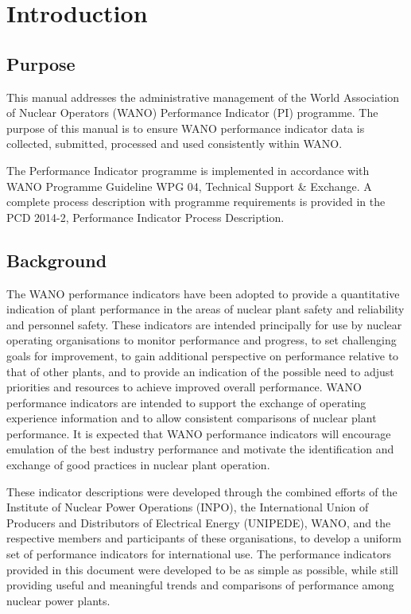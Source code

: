 \section*{Introduction}
\subsection*{Purpose}
This manual addresses the administrative management of the World
Association of Nuclear Operators (WANO) Performance Indicator (PI)
programme. The purpose of this manual is to ensure WANO performance
indicator data is collected, submitted, processed and used
consistently within WANO.

The Performance Indicator programme is implemented in accordance with
WANO Programme Guideline WPG 04, Technical Support \& Exchange. A
complete process description with programme requirements is provided
in the PCD 2014-2, Performance Indicator Process Description.

\subsection*{Background}
The WANO performance indicators have been adopted to provide a
quantitative indication of plant performance in the areas of nuclear
plant safety and reliability and personnel safety. These indicators
are intended principally for use by nuclear operating organisations to
monitor performance and progress, to set challenging goals for
improvement, to gain additional perspective on performance relative to
that of other plants, and to provide an indication of the possible
need to adjust priorities and resources to achieve improved overall
performance. WANO performance indicators are intended to support the
exchange of operating experience information and to allow consistent
comparisons of nuclear plant performance. It is expected that WANO
performance indicators will encourage emulation of the best industry
performance and motivate the identification and exchange of good
practices in nuclear plant operation.

These indicator descriptions were developed through the combined
efforts of the Institute of Nuclear Power Operations (INPO), the
International Union of Producers and Distributors of Electrical Energy
(UNIPEDE), WANO, and the respective members and participants of these
organisations, to develop a uniform set of performance indicators for
international use. The performance indicators provided in this
document were developed to be as simple as possible, while still
providing useful and meaningful trends and comparisons of performance
among nuclear power plants.

